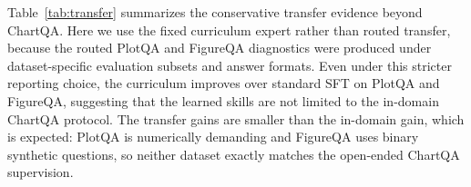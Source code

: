 \documentclass[journal]{IEEEtran}
\begin{document}
\begin{table}[!t]
\centering
\footnotesize
{}
\vspace{4pt}
\caption{Cross-dataset transfer of the curriculum-trained fixed expert. We report the conservative fixed-expert transfer setting used in the original experiments, avoiding routed transfer numbers when evaluation protocols differ across datasets.}
\label{tab:transfer}
\end{table}

Table~\ref{tab:transfer} summarizes the conservative transfer evidence beyond ChartQA.
Here we use the fixed curriculum expert rather than routed transfer, because the routed PlotQA and FigureQA diagnostics were produced under dataset-specific evaluation subsets and answer formats.
Even under this stricter reporting choice, the curriculum improves over standard SFT on PlotQA and FigureQA, suggesting that the learned skills are not limited to the in-domain ChartQA protocol.
The transfer gains are smaller than the in-domain gain, which is expected: PlotQA is numerically demanding and FigureQA uses binary synthetic questions, so neither dataset exactly matches the open-ended ChartQA supervision.
\end{document}
